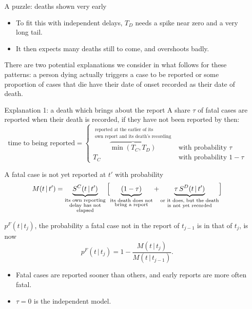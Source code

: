 \documentclass[aspectratio=169,9pt]{beamer}
\newcommand{\given}{\,|\,}
\begin{document}
\begin{frame}{A puzzle: deaths shown very early}
\begin{itemize}
\item To fit this with independent delays, $T_D$ needs a spike near zero and
a very long tail.
\item It then expects many deaths still to come, and overshoots badly.
\end{itemize}

\bigskip
There are two potential explanations we consider in what follows for these
patterns: a person dying actually triggers a case to be reported or some
proportion of cases that die have their date of onset recorded as their date
of death.
\end{frame}

\begin{frame}{Explanation 1: a death which brings about the report}
A share $\tau$ of fatal cases are reported when their death is recorded, if
they have not been reported by then:
\[
\text{time to being reported}=
\begin{cases}
\overbrace{\min(T_C,T_D)}^{\substack{\text{reported at the earlier of its}\\\text{own report and its death's recording}}} & \text{with probability } \tau\\
T_C & \text{with probability } 1-\tau
\end{cases}
\]

A fatal case is not yet reported at $t'$ with probability
\[
M(t\given t')=\underbrace{S^{C}(t\given t')}_{\substack{\text{its own reporting}\\\text{delay has not}\\\text{elapsed}}}\,
\Bigl[\underbrace{(1-\tau)}_{\substack{\text{its death does not}\\\text{bring a report}}}
+\underbrace{\tau\,S^{D}(t\given t')}_{\substack{\text{or it does, but the death}\\\text{is not yet recorded}}}\Bigr]
\]

$p^{F}(t\given t_j)$, the probability a fatal case not in the report of
$t_{j-1}$ is in that of $t_j$, is now
\[
p^{F}(t\given t_j)=1-\frac{M(t\given t_j)}{M(t\given t_{j-1})}.
\]

\begin{itemize}
\item Fatal cases are reported sooner than others, and early reports are
more often fatal.
\item $\tau=0$ is the independent model.
\end{itemize}
\end{frame}
\end{document}
